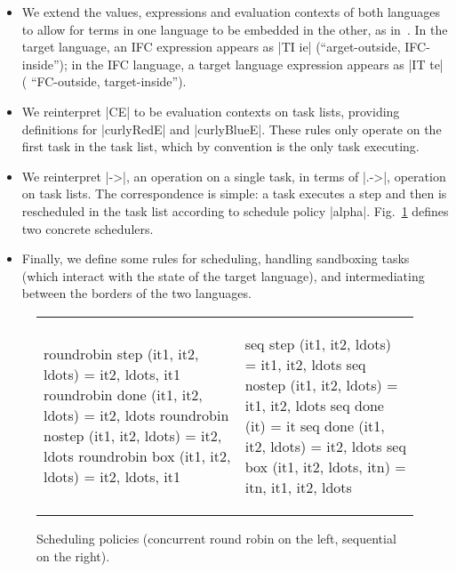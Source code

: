 \begin{itemize}
    \item We extend the values, expressions and evaluation contexts of
      both languages to allow for terms in one language to
      be embedded in the other, as
      in~\cite{Matthews:2007:OSM:1190216.1190220}.
In the target language, an IFC expression appears as |TI ie| (``arget-outside,
IFC-inside''); in the IFC language, a target language expression appears as |IT
te| ( ``{\color{blue}{I}}FC-outside, target-inside'').
    \item We reinterpret |CE| to be evaluation contexts on task lists, providing definitions for |curlyRedE| and |curlyBlueE|.  These rules only operate on the first task in the task list, which by convention is the only task executing.
    \item We reinterpret |->|, an operation on a single task, in terms of |.->|, operation on task lists.  The correspondence is simple: a task executes a step and then is rescheduled in the task list according to schedule policy |alpha|.
    Fig.~\ref{fig:scheduler} defines two concrete schedulers.
    \item Finally, we define some rules for scheduling, handling sandboxing tasks (which interact with the state of the target language),
    and intermediating between the borders of the two languages.
\end{itemize}

\begin{figure}[t]
\begin{tabular}{ll}
\begin{minipage}{.45\textwidth}
\begin{code}
  roundrobin step (it1, it2, ldots)    = it2, ldots, it1
  roundrobin done (it1, it2, ldots)    = it2, ldots
  roundrobin nostep (it1, it2, ldots)  = it2, ldots
  roundrobin box (it1, it2, ldots)     = it2, ldots, it1
\end{code}
\end{minipage} &
\begin{minipage}{.45\textwidth}
\begin{code}
  seq step (it1, it2, ldots)      = it1, it2, ldots
  seq nostep (it1, it2, ldots)    = it1, it2, ldots
  seq done (it)                   = it
  seq done (it1, it2, ldots)      = it2, ldots
  seq box (it1, it2, ldots, itn)  = itn, it1, it2, ldots
\end{code}
\end{minipage}
\end{tabular}
\vspace*{-0.5cm}
\caption{Scheduling policies (concurrent round robin on the left, sequential on the right).}
\label{fig:scheduler}
\end{figure}

